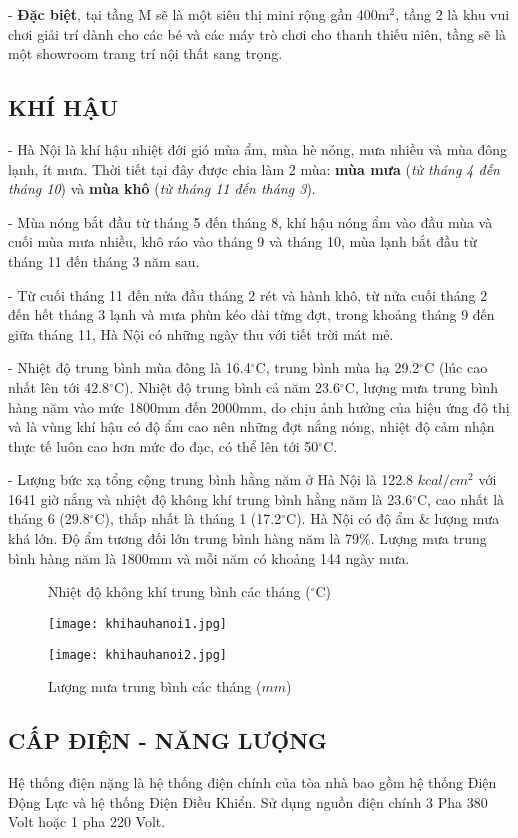 	- \textbf{Đặc biệt}, tại tầng M sẽ là một siêu thị mini rộng gần 400m$^{2}$, tầng 2 là khu vui chơi giải trí dành cho các bé và các máy trò chơi cho thanh thiếu niên, tầng sẽ là một showroom trang trí nội thất sang trọng.
	
	\subsection{KHÍ HẬU}
	- Hà Nội là khí hậu nhiệt đới gió mùa ẩm, mùa hè nóng, mưa nhiều và mùa đông lạnh, ít mưa. Thời tiết tại đây được chia làm 2 mùa: \textbf{mùa mưa} (\emph{từ tháng 4 đến tháng 10}) và \textbf{mùa khô} (\emph{từ tháng 11 đến tháng 3}).
	
	- Mùa nóng bắt đầu từ tháng 5 đến tháng 8, khí hậu nóng ẩm vào đầu mùa và cuối mùa mưa nhiều, khô ráo vào tháng 9 và tháng 10, mùa lạnh bắt đầu từ tháng 11 đến tháng 3 năm sau.
	
	- Từ cuối tháng 11 đến nửa đầu tháng 2 rét và hành khô, từ nửa cuối tháng 2 đến hết tháng 3 lạnh và mưa phùn kéo dài từng đợt, trong khoảng tháng 9 đến giữa tháng 11, Hà Nội có những ngày thu với tiết trời mát mẻ.
	
	- Nhiệt độ trung bình mùa đông là 16.4$^{\circ}$C, trung bình mùa hạ 29.2$^{\circ}$C (lúc cao nhất lên tới 42.8$^{\circ}$C). Nhiệt độ trung bình cả năm 23.6$^{\circ}$C, lượng mưa trung bình hàng năm vào mức 1800mm đến 2000mm, do chịu ảnh hưởng của hiệu ứng đô thị và là vùng khí hậu có độ ẩm cao nên những đợt nắng nóng, nhiệt độ cảm nhận thực tế luôn cao hơn mức đo đạc, có thể lên tới 50$^{\circ}$C.
	
	- Lượng bức xạ tổng cộng trung bình hằng năm ở Hà Nội là 122.8 $ kcal/cm^{2} $ với 1641 giờ nắng và nhiệt độ không khí trung bình hằng năm là 23.6$^{\circ}$C, cao nhất là tháng 6 (29.8$^{\circ}$C), thấp nhất là tháng 1 (17.2$^{\circ}$C). Hà Nội có độ ẩm \& lượng mưa khá lớn. Độ ẩm tương đối lớn trung bình hàng năm là 79\%. Lượng mưa trung bình hàng năm là 1800mm và mỗi năm có khoảng 144 ngày mưa.
	
\begin{figure}[H]
	\centering
	\caption{Nhiệt độ không khí trung bình các tháng ($^{\circ}$C)}
	\texttt{[image: khihauhanoi1.jpg]}
	\caption{Lượng mưa trung bình các tháng ($ mm $)}
	\texttt{[image: khihauhanoi2.jpg]}	
\end{figure}
	
	\subsection{CẤP ĐIỆN - NĂNG LƯỢNG}
	Hệ thống điện nặng là hệ thống điện chính của tòa nhà bao gồm hệ thống Điện Động Lực và hệ thống Điện Điều Khiển. Sử dụng nguồn điện chính 3 Pha 380 Volt hoặc 1 pha 220 Volt.
	
